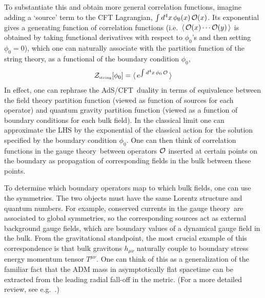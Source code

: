 \documentclass[12pt]{article}
\def\AC{AdS/CFT}
\def\GT{gauge theory}
\def\vev#1{\langle\, #1 \, \rangle}
\begin{document}
To substantiate this and obtain more general correlation functions, imagine adding a `source' term to the CFT Lagrangian,
$\int d^4 x \, \phi_0(x) \, {\cal O}(x)$. 
Its exponential gives a generating function of correlation functions (i.e.\ $\vev{{\cal O}(x) \cdots {\cal O}(y)}$ is obtained by taking functional derivatives with respect to $\phi_0$'s and then setting $\phi_0=0$),
which one can naturally associate with the partition function of the string theory, as a functional of the boundary condition $\phi_0$,
%
\begin{equation}
{\cal Z}_{\scriptscriptstyle {\rm string}}[\phi_0] = \vev{ e^{\int d^4x\, \phi_0\, {\cal O}}}
\label{corgen}
\end{equation}	
%
In effect, one can rephrase the \AC\ duality in terms of equivalence between the field theory partition function (viewed as function of sources for each operator) and quantum gravity partition function (viewed as a function of boundary conditions for each bulk field).
In the classical limit one can approximate the LHS by the exponential of the classical action for the solution specified by the boundary condition $\phi_0$.
One can then think of correlation functions in the \GT\ between operators ${\cal O}$ inserted at certain points on the boundary as propagation of corresponding fields in the bulk between these points.

To determine which boundary operators map to which bulk fields, one can use the symmetries.  The two objects must have the same Lorentz structure and quantum numbers.  For example, conserved currents in the \GT\ are associated to global symmetries, so the corresponding sources act as external background gauge fields, which are boundary values of a dynamical gauge field in the bulk.  From the gravitational standpoint, the most crucial example of this correspondence is that bulk gravitons $h_{\mu\nu}$ naturally couple to boundary stress energy momentum tensor $T^{\mu\nu}$.  One can think of this as a generalization of the familiar fact that the ADM mass in asymptotically flat spacetime can be extracted from the leading radial fall-off in the metric.  (For a more detailed review, see e.g.\ \cite{Fischetti:2012rd}.)
\end{document}
